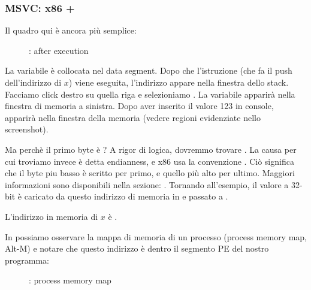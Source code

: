 \clearpage
\subsubsection{MSVC: x86 + \olly}
\myindex{\olly}

Il quadro qui è ancora più semplice:

\begin{figure}[H]
\centering
{}
\caption{\olly: after \scanf execution}
\label{fig:scanf_ex2_olly_1}
\end{figure}

La variabile è collocata nel data segment.
Dopo che l'istruzione \PUSH (che fa il push dell'indirizzo di $x$) viene eseguita, 
l'indirizzo appare nella finestra dello stack. Facciamo click destro su quella riga e selezioniamo .
La variabile apparirà nella finestra di memoria a sinistra.
Dopo aver inserito il valore 123 in console, 
 apparirà nella finestra della memoria (vedere regioni evidenziate nello screenshot).

Ma perchè il primo byte è ?
A rigor di logica, dovremmo trovare .
La causa per cui troviamo invece  è detta \gls{endianness}, e x86 usa la convenzione .
Ciò significa che il byte piu basso è scritto per primo, e quello più alto per ultimo.
Maggiori informazioni sono disponibili nella sezione: .
Tornando all'esempio, il valore a 32-bit è caricato da questo indirizzo di memoria in \EAX e passato a \printf.

L'indirizzo in memoria di $x$ è .

\clearpage
\label{olly_memory_map_example}

In \olly possiamo osservare la mappa di memoria di un processo  (process memory map, Alt-M)
e notare che questo indirizzo è dentro il segmento PE  del nostro programma:

\begin{figure}[H]
\centering
{}
\caption{\olly: process memory map}
\label{fig:scanf_ex2_olly_2}
\end{figure}

